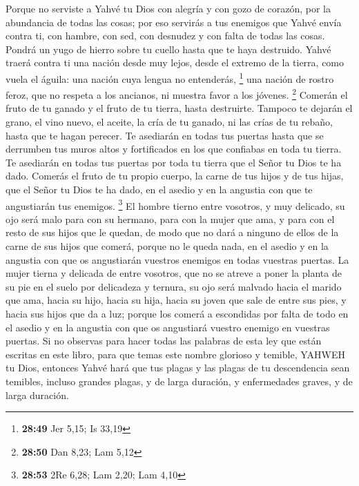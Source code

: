  Porque no serviste a Yahvé tu Dios con alegría y con
gozo de corazón, por la abundancia de todas las cosas; 
por eso servirás a tus enemigos que Yahvé envía contra ti, con hambre,
con sed, con desnudez y con falta de todas las cosas. Pondrá un yugo de
hierro sobre tu cuello hasta que te haya destruido. 
Yahvé traerá contra ti una nación desde muy lejos, desde el extremo de
la tierra, como vuela el águila: una nación cuya lengua no entenderás,
\footnote{\textbf{28:49} Jer 5,15; Is 33,19}  una nación
de rostro feroz, que no respeta a los ancianos, ni muestra favor a los
jóvenes. \footnote{\textbf{28:50} Dan 8,23; Lam 5,12} 
Comerán el fruto de tu ganado y el fruto de tu tierra, hasta destruirte.
Tampoco te dejarán el grano, el vino nuevo, el aceite, la cría de tu
ganado, ni las crías de tu rebaño, hasta que te hagan perecer.
 Te asediarán en todas tus puertas hasta que se derrumben
tus muros altos y fortificados en los que confiabas en toda tu tierra.
Te asediarán en todas tus puertas por toda tu tierra que el Señor tu
Dios te ha dado.  Comerás el fruto de tu propio cuerpo,
la carne de tus hijos y de tus hijas, que el Señor tu Dios te ha dado,
en el asedio y en la angustia con que te angustiarán tus enemigos.
\footnote{\textbf{28:53} 2Re 6,28; Lam 2,20; Lam 4,10} 
El hombre tierno entre vosotros, y muy delicado, su ojo será malo para
con su hermano, para con la mujer que ama, y para con el resto de sus
hijos que le quedan,  de modo que no dará a ninguno de
ellos de la carne de sus hijos que comerá, porque no le queda nada, en
el asedio y en la angustia con que os angustiarán vuestros enemigos en
todas vuestras puertas.  La mujer tierna y delicada de
entre vosotros, que no se atreve a poner la planta de su pie en el suelo
por delicadeza y ternura, su ojo será malvado hacia el marido que ama,
hacia su hijo, hacia su hija,  hacia su joven que sale de
entre sus pies, y hacia sus hijos que da a luz; porque los comerá a
escondidas por falta de todo en el asedio y en la angustia con que os
angustiará vuestro enemigo en vuestras puertas.  Si no
observas para hacer todas las palabras de esta ley que están escritas en
este libro, para que temas este nombre glorioso y temible, YAHWEH tu
Dios,  entonces Yahvé hará que tus plagas y las plagas de
tu descendencia sean temibles, incluso grandes plagas, y de larga
duración, y enfermedades graves, y de larga duración. 
